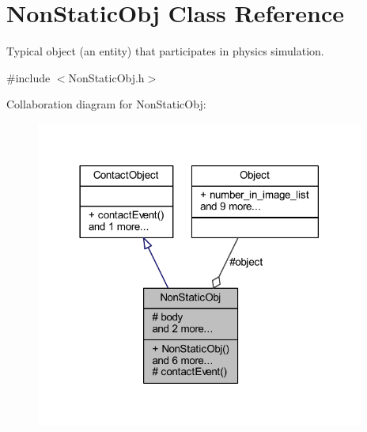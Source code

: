 \hypertarget{class_non_static_obj}{}\section{Non\+Static\+Obj Class Reference}
\label{class_non_static_obj}


Typical object (an entity) that participates in physics simulation.  




{\ttfamily \#include $<$Non\+Static\+Obj.\+h$>$}



Collaboration diagram for Non\+Static\+Obj\+:\nopagebreak
\begin{figure}[H]
\begin{center}
\leavevmode
\includegraphics[width=306pt]{class_non_static_obj__coll__graph}
\end{center}
\end{figure}
